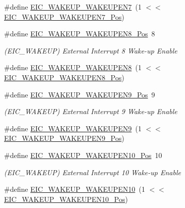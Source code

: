 \begin{DoxyCompactItemize}
\#define \mbox{\hyperlink{group___s_a_m_d21___e_i_c_ga4ff342851806a7125a2f69b034cc4888}{E\+I\+C\+\_\+\+W\+A\+K\+E\+U\+P\+\_\+\+W\+A\+K\+E\+U\+P\+E\+N7}}~(1 $<$$<$ \mbox{\hyperlink{group___s_a_m_d21___e_i_c_gaf85c758bb81382d2482a3e4148f80d67}{E\+I\+C\+\_\+\+W\+A\+K\+E\+U\+P\+\_\+\+W\+A\+K\+E\+U\+P\+E\+N7\+\_\+\+Pos}})
\item 
\#define \mbox{\hyperlink{group___s_a_m_d21___e_i_c_ga4ea6d6f840e6b3c765e2709d3a8a1ca4}{E\+I\+C\+\_\+\+W\+A\+K\+E\+U\+P\+\_\+\+W\+A\+K\+E\+U\+P\+E\+N8\+\_\+\+Pos}}~8
\begin{DoxyCompactList}\small\item\em (E\+I\+C\+\_\+\+W\+A\+K\+E\+UP) External Interrupt 8 Wake-\/up Enable \end{DoxyCompactList}\item 
\#define \mbox{\hyperlink{group___s_a_m_d21___e_i_c_gacb997ffc8107685a43049194694f1815}{E\+I\+C\+\_\+\+W\+A\+K\+E\+U\+P\+\_\+\+W\+A\+K\+E\+U\+P\+E\+N8}}~(1 $<$$<$ \mbox{\hyperlink{group___s_a_m_d21___e_i_c_ga4ea6d6f840e6b3c765e2709d3a8a1ca4}{E\+I\+C\+\_\+\+W\+A\+K\+E\+U\+P\+\_\+\+W\+A\+K\+E\+U\+P\+E\+N8\+\_\+\+Pos}})
\item 
\#define \mbox{\hyperlink{group___s_a_m_d21___e_i_c_ga3447eca2bd58027fa43ce88f35f5fb38}{E\+I\+C\+\_\+\+W\+A\+K\+E\+U\+P\+\_\+\+W\+A\+K\+E\+U\+P\+E\+N9\+\_\+\+Pos}}~9
\begin{DoxyCompactList}\small\item\em (E\+I\+C\+\_\+\+W\+A\+K\+E\+UP) External Interrupt 9 Wake-\/up Enable \end{DoxyCompactList}\item 
\#define \mbox{\hyperlink{group___s_a_m_d21___e_i_c_ga0dc41f5f331cd5398dafc0febe6188f4}{E\+I\+C\+\_\+\+W\+A\+K\+E\+U\+P\+\_\+\+W\+A\+K\+E\+U\+P\+E\+N9}}~(1 $<$$<$ \mbox{\hyperlink{group___s_a_m_d21___e_i_c_ga3447eca2bd58027fa43ce88f35f5fb38}{E\+I\+C\+\_\+\+W\+A\+K\+E\+U\+P\+\_\+\+W\+A\+K\+E\+U\+P\+E\+N9\+\_\+\+Pos}})
\item 
\#define \mbox{\hyperlink{group___s_a_m_d21___e_i_c_ga4a26f7fac25544b9467d8951d9fa5590}{E\+I\+C\+\_\+\+W\+A\+K\+E\+U\+P\+\_\+\+W\+A\+K\+E\+U\+P\+E\+N10\+\_\+\+Pos}}~10
\begin{DoxyCompactList}\small\item\em (E\+I\+C\+\_\+\+W\+A\+K\+E\+UP) External Interrupt 10 Wake-\/up Enable \end{DoxyCompactList}\item 
\#define \mbox{\hyperlink{group___s_a_m_d21___e_i_c_ga3e1747be27ae69e509c0f5fcace995c3}{E\+I\+C\+\_\+\+W\+A\+K\+E\+U\+P\+\_\+\+W\+A\+K\+E\+U\+P\+E\+N10}}~(1 $<$$<$ \mbox{\hyperlink{group___s_a_m_d21___e_i_c_ga4a26f7fac25544b9467d8951d9fa5590}{E\+I\+C\+\_\+\+W\+A\+K\+E\+U\+P\+\_\+\+W\+A\+K\+E\+U\+P\+E\+N10\+\_\+\+Pos}})

\end{DoxyCompactItemize}
